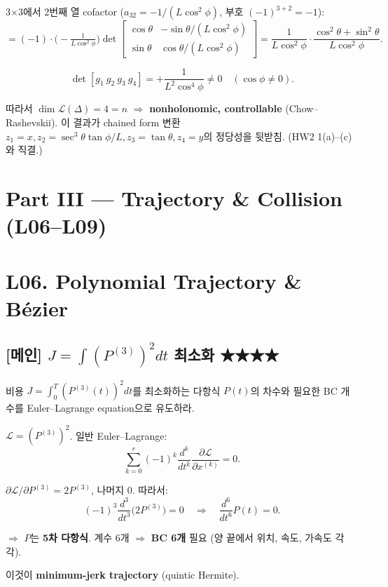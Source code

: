 \documentclass[11pt,a4paper]{article}
\begin{document}
\begin{sol}
3×3에서 2번째 열 cofactor ($a_{32} = -1/(L\cos^2\phi)$, 부호 $(-1)^{3+2}=-1$):
\[
= (-1)\cdot\bigl(-\tfrac{1}{L\cos^2\phi}\bigr)\det\begin{bmatrix}\cos\theta & -\sin\theta/(L\cos^2\phi)\\\sin\theta & \cos\theta/(L\cos^2\phi)\end{bmatrix} = \frac{1}{L\cos^2\phi}\cdot\frac{\cos^2\theta + \sin^2\theta}{L\cos^2\phi}.
\]

\[
\boxed{\det[g_1\ g_2\ g_3\ g_4] = +\frac{1}{L^2\cos^4\phi} \neq 0\quad (\cos\phi \neq 0).}
\]

따라서 $\dim\mathcal{L}(\Delta) = 4 = n$ $\Rightarrow$ \textbf{nonholonomic, controllable} (Chow--Rashevskii). 이 결과가 chained form 변환 $z_1 = x, z_2 = \sec^3\theta\tan\phi/L, z_3 = \tan\theta, z_4 = y$의 정당성을 뒷받침. (HW2 1(a)--(c)와 직결.)
\end{sol}

\section*{Part III --- Trajectory \& Collision (L06--L09)}

\section{L06. Polynomial Trajectory \& Bézier}

\subsection*{[메인] $J = \int (P^{(3)})^2 dt$ 최소화 \hfill ★★★★}

\begin{prob}
비용 $J = \int_0^T (P^{(3)}(t))^2 dt$를 최소화하는 다항식 $P(t)$의 차수와 필요한 BC 개수를 Euler--Lagrange equation으로 유도하라.
\end{prob}

\begin{sol}
$\mathcal{L} = (P^{(3)})^2$. 일반 Euler--Lagrange:
\[
\sum_{k=0}^r (-1)^k \frac{d^k}{dt^k}\frac{\partial \mathcal{L}}{\partial x^{(k)}} = 0.
\]

$\partial\mathcal{L}/\partial P^{(3)} = 2 P^{(3)}$, 나머지 0. 따라서:
\[
(-1)^3 \frac{d^3}{dt^3}\bigl(2 P^{(3)}\bigr) = 0 \quad\Rightarrow\quad \frac{d^6}{dt^6} P(t) = 0.
\]

$\Rightarrow$ $P$는 \textbf{5차 다항식}. 계수 6개 $\Rightarrow$ \textbf{BC 6개} 필요 (양 끝에서 위치, 속도, 가속도 각각).

이것이 \textbf{minimum-jerk trajectory} (quintic Hermite).
\end{sol}
\end{document}

